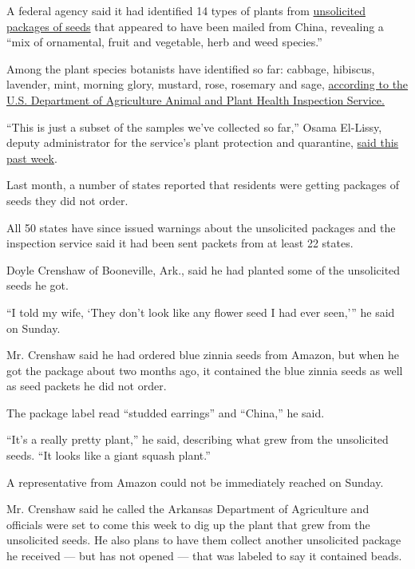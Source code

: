 A federal agency said it had identified 14 types of plants from
\href{https://www.nytimes3xbfgragh.onion/2020/07/26/us/seeds-from-china-mail.html}{unsolicited
packages of seeds} that appeared to have been mailed from China,
revealing a ``mix of ornamental, fruit and vegetable, herb and weed
species.''

Among the plant species botanists have identified so far: cabbage,
hibiscus, lavender, mint, morning glory, mustard, rose, rosemary and
sage,
\href{https://www.aphis.usda.gov/publications/plant_health/faq-unsolicited-seeds.pdf}{according
to the U.S. Department of Agriculture Animal and Plant Health Inspection
Service.}

``This is just a subset of the samples we've collected so far,'' Osama
El-Lissy, deputy administrator for the service's plant protection and
quarantine,
\href{https://www.usda.gov/media/radio/daily-newsline/2020-07-29/actuality-unsolicited-seeds-are-several-plant-species}{said
this past week}.

Last month, a number of states reported that residents were getting
packages of seeds they did not order.

All 50 states have since issued warnings about the unsolicited packages
and the inspection service said it had been sent packets from at least
22 states.

Doyle Crenshaw of Booneville, Ark., said he had planted some of the
unsolicited seeds he got.

``I told my wife, `They don't look like any flower seed I had ever
seen,''' he said on Sunday.

Mr. Crenshaw said he had ordered blue zinnia seeds from Amazon, but when
he got the package about two months ago, it contained the blue zinnia
seeds as well as seed packets he did not order.

The package label read ``studded earrings'' and ``China,'' he said.

``It's a really pretty plant,'' he said, describing what grew from the
unsolicited seeds. ``It looks like a giant squash plant.''

A representative from Amazon could not be immediately reached on Sunday.

Mr. Crenshaw said he called the Arkansas Department of Agriculture and
officials were set to come this week to dig up the plant that grew from
the unsolicited seeds. He also plans to have them collect another
unsolicited package he received --- but has not opened --- that was
labeled to say it contained beads.

